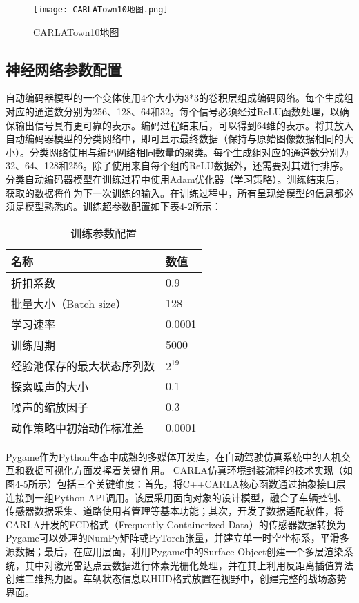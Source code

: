 \begin{figure}[hbt]
	\centering
	\texttt{[image: CARLATown10地图.png]}
	\caption{CARLATown10地图}
	\label{f.example}
\end{figure}

\subsection{神经网络参数配置  }


自动编码器模型的一个变体使用4个大小为3*3的卷积层组成编码网络。每个生成组对应的通道数分别为256、128、64和32。每个信号必须经过ReLU函数处理，以确保输出信号具有更可靠的表示。编码过程结束后，可以得到64维的表示。将其放入自动编码器模型的分类网络中，即可显示最终数据（保持与原始图像数据相同的大小）。分类网络使用与编码网络相同数量的聚类。每个生成组对应的通道数分别为32、64、128和256。除了使用来自每个组的ReLU数据外，还需要对其进行排序。分类自动编码器模型在训练过程中使用Adam优化器（学习策略）。训练结束后，获取的数据将作为下一次训练的输入。在训练过程中，所有呈现给模型的信息都必须是模型熟悉的。训练超参数配置如下表4-2所示：

\begin{table}[htbp]
	\centering
	\caption{训练参数配置}
	\label{tab:params}
	\begin{tabular}{ll}
		\toprule
		\textbf{名称}                     & \textbf{数值}                \\
		\midrule
		折扣系数                        & 0.9                         \\
		批量大小（Batch size）          & 128                         \\
		学习速率                        & 0.0001                      \\
		训练周期                        & 5000                        \\
		经验池保存的最大状态序列数       & $2^{19}$                    \\
		探索噪声的大小                   & 0.1                         \\
		噪声的缩放因子                   & 0.3                         \\
		动作策略中初始动作标准差         & 0.0001                      \\
		\bottomrule
	\end{tabular}
\end{table}

Pygame作为Python生态中成熟的多媒体开发库，在自动驾驶仿真系统中的人机交互和数据可视化方面发挥着关键作用。 CARLA仿真环境封装流程的技术实现（如图4-5所示）包括三个关键维度：首先，将C++CARLA核心函数通过抽象接口层连接到一组Python API调用。该层采用面向对象的设计模型，融合了车辆控制、传感器数据采集、道路使用者管理等基本功能；其次，开发了数据适配软件，将CARLA开发的FCD格式（Frequently Containerized Data）的传感器数据转换为Pygame可以处理的NumPy矩阵或PyTorch张量，并建立单一时空坐标系，平滑多源数据；最后，在应用层面，利用Pygame中的Surface Object创建一个多层渲染系统，其中对激光雷达点云数据进行体素光栅化处理，并在其上利用反距离插值算法创建二维热力图。车辆状态信息以HUD格式放置在视野中，创建完整的战场态势界面。


